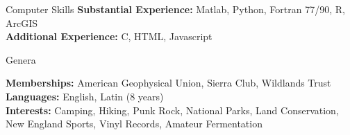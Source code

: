 \documentclass{resume} %
\begin{document}
\begin{rSection}{Computer Skills}
\textbf{Substantial Experience:} Matlab, Python, Fortran 77/90, R, ArcGIS \\
\textbf{Additional Experience:} C, HTML, Javascript
\end{rSection}


\begin{rSection}{Genera}

\textbf{Memberships:} American Geophysical Union, Sierra Club, Wildlands Trust \\
\textbf{Languages:} English, Latin (8 years) \\
\textbf{Interests:} Camping, Hiking, Punk Rock, National Parks, Land Conservation, New England Sports, Vinyl Records, Amateur Fermentation \\ 

\end{rSection}

%
%
%








\end{document}
